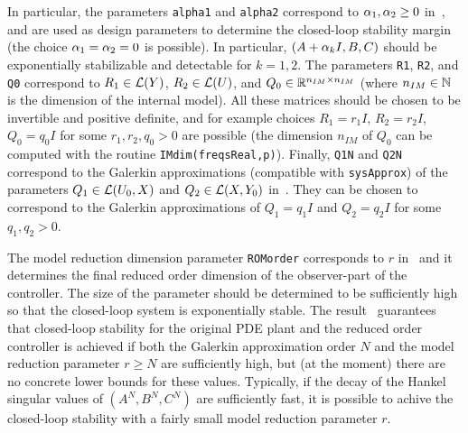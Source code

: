 \documentclass[11pt, a4paper]{amsart}
\theoremstyle{definition}
\numberwithin{equation}{section}
\begin{document}
\begin{itemize}
In particular, the parameters \texttt{alpha1} and \texttt{alpha2} correspond to $\alpha_1,\alpha_2\geq 0$ in~, and are used as design parameters to determine the closed-loop stability margin (the choice $\alpha_1=\alpha_2=0$ is possible). In particular, $(A+\alpha_k I,B,C)$ should be exponentially stabilizable and detectable for $k=1,2$.
The parameters 
\texttt{R1}, \texttt{R2}, and \texttt{Q0} correspond to $R_1\in {\mathcal{L}}(Y)$, $R_2\in {\mathcal{L}}(U)$, and $Q_0\in {\mathbb{R}}^{n_{IM}\times n_{IM}}$ (where $n_{IM}\in {\mathbb{N}}$ is the dimension of the internal model). All these matrices should be chosen to be invertible and positive definite, and for example choices $R_1=r_1 I$, $R_2=r_2 I$, $Q_0=q_0 I$ for some $r_1,r_2,q_0>0$ are possible
 (the dimension $n_{IM}$ of $Q_0$ can be computed with the routine \texttt{IMdim(freqsReal,p)}). Finally,
\texttt{Q1N} and \texttt{Q2N} correspond to  the Galerkin approximations (compatible with \texttt{sysApprox}) of the parameters $Q_1\in {\mathcal{L}}(U_0,X)$ and $Q_2\in {\mathcal{L}}(X,Y_0)$ in~. They
can be chosen to correspond to the Galerkin approximations of $Q_1=q_1 I$ and $Q_2=q_2 I$ for some  $q_1,q_2>0$.

The model reduction dimension parameter \texttt{ROMorder} corresponds to $r$ in~ and it determines the final reduced order dimension of the observer-part of the controller. The size of the parameter should be determined to be sufficiently high so that the closed-loop system is exponentially stable. The result~ guarantees that closed-loop stability for the original PDE plant and the reduced order controller is achieved if both the Galerkin approximation order $N$ and the model reduction parameter $r\geq N$ are sufficiently high, but (at the moment) there are no concrete lower bounds for these values. Typically, if the decay of the Hankel singular values of $(A^N,B^N,C^N)$ are sufficiently fast, it is possible to achive the closed-loop stability with a fairly small model reduction parameter $r$.

	\bigskip


\end{itemize}
\end{document}
